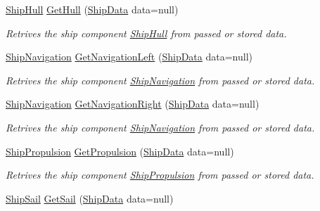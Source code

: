 \begin{DoxyCompactItemize}
\hyperlink{class_skyrates_1_1_client_1_1_ship_1_1_ship_hull}{Ship\-Hull} \hyperlink{class_skyrates_1_1_client_1_1_ship_1_1_ship_builder_ae2c2bae13bb9838f890cea59146b9c08}{Get\-Hull} (\hyperlink{class_ship_data}{Ship\-Data} data=null)
\begin{DoxyCompactList}\small\item\em Retrives the ship component \hyperlink{class_skyrates_1_1_client_1_1_ship_1_1_ship_hull}{Ship\-Hull} from passed or stored data. \end{DoxyCompactList}\item 
\hyperlink{class_skyrates_1_1_client_1_1_ship_1_1_ship_navigation}{Ship\-Navigation} \hyperlink{class_skyrates_1_1_client_1_1_ship_1_1_ship_builder_a34895f96ee52dcb26c94b58fc8c4acbc}{Get\-Navigation\-Left} (\hyperlink{class_ship_data}{Ship\-Data} data=null)
\begin{DoxyCompactList}\small\item\em Retrives the ship component \hyperlink{class_skyrates_1_1_client_1_1_ship_1_1_ship_navigation}{Ship\-Navigation} from passed or stored data. \end{DoxyCompactList}\item 
\hyperlink{class_skyrates_1_1_client_1_1_ship_1_1_ship_navigation}{Ship\-Navigation} \hyperlink{class_skyrates_1_1_client_1_1_ship_1_1_ship_builder_a4eb866fb928986aef1643a1d1ba736c3}{Get\-Navigation\-Right} (\hyperlink{class_ship_data}{Ship\-Data} data=null)
\begin{DoxyCompactList}\small\item\em Retrives the ship component \hyperlink{class_skyrates_1_1_client_1_1_ship_1_1_ship_navigation}{Ship\-Navigation} from passed or stored data. \end{DoxyCompactList}\item 
\hyperlink{class_skyrates_1_1_client_1_1_ship_1_1_ship_propulsion}{Ship\-Propulsion} \hyperlink{class_skyrates_1_1_client_1_1_ship_1_1_ship_builder_ac92e1e3ad5755dca444b6d18d93c9a42}{Get\-Propulsion} (\hyperlink{class_ship_data}{Ship\-Data} data=null)
\begin{DoxyCompactList}\small\item\em Retrives the ship component \hyperlink{class_skyrates_1_1_client_1_1_ship_1_1_ship_propulsion}{Ship\-Propulsion} from passed or stored data. \end{DoxyCompactList}\item 
\hyperlink{class_skyrates_1_1_client_1_1_ship_1_1_ship_sail}{Ship\-Sail} \hyperlink{class_skyrates_1_1_client_1_1_ship_1_1_ship_builder_a44d9c44d336bb602efe3fd68d5ed81c6}{Get\-Sail} (\hyperlink{class_ship_data}{Ship\-Data} data=null)

\end{DoxyCompactItemize}
